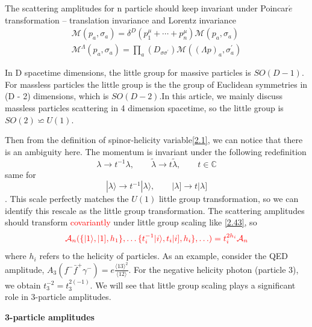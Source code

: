 \documentclass[12pt]{article}
\numberwithin{equation}{section}
\newcommand{\avg}[1]{\langle #1 \rangle}
\newcommand{\aket}[1]{|#1\rangle}
\newcommand{\sket}[1]{|#1]}
\begin{document}
The scattering amplitudes for n particle should keep invariant under Poincar$\acute{e}$ transformation -- translation invariance and Lorentz invariance
\begin{gather}
    \mathcal{M}(p_a,\sigma_a)=\delta^D(p_1^\mu+\cdots +p_n^\mu)\mathcal{M}(p_a,\sigma_a)\\
    \mathcal{M}^\Lambda(p_a,\sigma_a)=\prod_{a}(D_{\sigma\sigma^{'}})\mathcal{M}((\Lambda p)_a,\sigma_a^{'})
    \label{2.43}
\end{gather}

In D spacetime dimensions, the little group for massive particles is $SO(D-1)$. For massless
particles the little group is the the group of Euclidean symmetries in (D - 2) dimensions, which
is $SO(D-2)$.In this article, we mainly discuss massless particles scattering in 4 dimension spacetime, so the little group is $SO(2)\backsimeq U(1)$.

Then from the definition of spinor-helicity variable\eqref{2.1}, we can notice that there is an ambiguity here.
The momentum is invariant under the following redefinition
    \begin{equation}
        \lambda \rightarrow t^{-1}\lambda, \qquad \tilde{\lambda}\rightarrow t\tilde{\lambda}, \qquad t\in\mathbb{C} 
    \end{equation}
    same for
    \begin{equation}
        \aket{\lambda}\rightarrow t^{-1}\aket{\lambda}, \qquad \sket{\lambda}\rightarrow t\sket{\lambda}
    \end{equation}.
This scale perfectly matches the $U(1)$ little group transformation, so we can identify this rescale as the little group transformation.
The scattering amplitudes should transform \textcolor{red}{covariantly} under little group scaling like \eqref{2.43}, so
\begin{equation}
    \color{red} \mathcal{A}_n(\{\aket{1},\sket{1},h_1\},\ldots\{t_i^{-1}\aket{i},t_i\sket{i},h_i\},\ldots )=t_i^{2h_i}\mathcal{A}_n
    \label{2.46}
\end{equation}
where $h_i$ refers to the helicity of particles.
As an example, consider the QED amplitude, $A_3(f^-\bar{f}^+\gamma^-)=e\frac{\avg{13}^2}{\avg{12}}$. For the negative helicity photon (particle 3), we obtain $t_3^{-2}=t_3^{2(-1)}$.
We will see that little group scaling plays a significant role in 3-particle amplitudes.

\noindent
\textbf{3-particle amplitudes}
\end{document}
